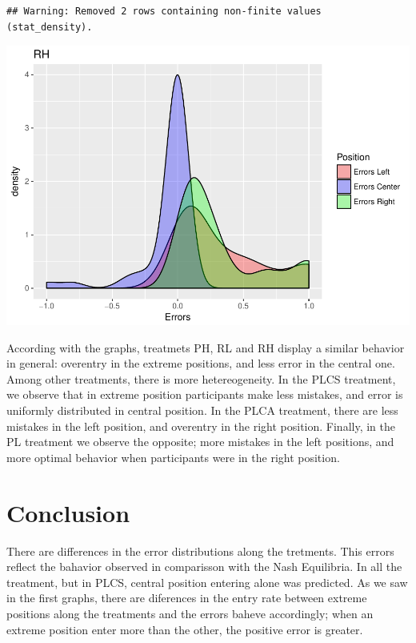 \documentclass[]{article}
\begin{document}
\begin{verbatim}
## Warning: Removed 2 rows containing non-finite values (stat_density).
\end{verbatim}

\includegraphics{individual_analysis_report_files/figure-latex/unnamed-chunk-9-6.pdf}

According with the graphs, treatmets PH, RL and RH display a similar
behavior in general: overentry in the extreme positions, and less error
in the central one. Among other treatments, there is more
hetereogeneity. In the PLCS treatment, we observe that in extreme
position participants make less mistakes, and error is uniformly
distributed in central position. In the PLCA treatment, there are less
mistakes in the left position, and overentry in the right position.
Finally, in the PL treatment we observe the opposite; more mistakes in
the left positions, and more optimal behavior when participants were in
the right position.

\section{Conclusion}\label{conclusion}

There are differences in the error distributions along the tretments.
This errors reflect the bahavior observed in comparisson with the Nash
Equilibria. In all the treatment, but in PLCS, central position entering
alone was predicted. As we saw in the first graphs, there are diferences
in the entry rate between extreme positions along the treatments and the
errors baheve accordingly; when an extreme position enter more than the
other, the positive error is greater.
\end{document}
